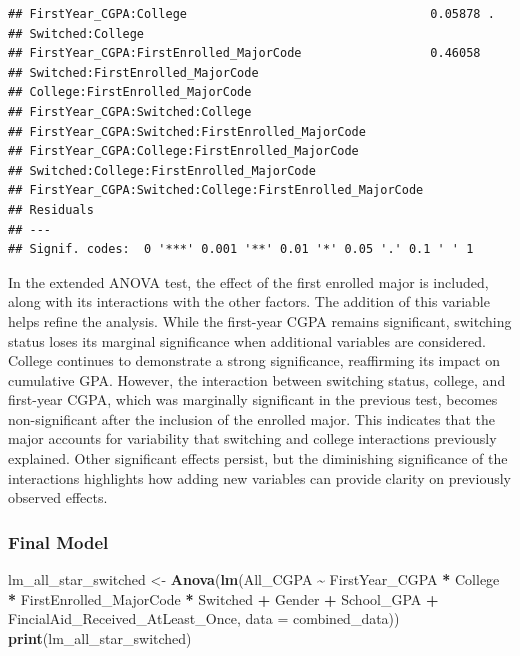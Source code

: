 \documentclass[
  12pt,
]{article}
\newenvironment{Shaded}{\begin{snugshade}}{\end{snugshade}}
\newcommand{\AttributeTok}[1]{\textcolor[rgb]{0.13,0.29,0.53}{#1}}
\newcommand{\FunctionTok}[1]{\textcolor[rgb]{0.13,0.29,0.53}{\textbf{#1}}}
\newcommand{\NormalTok}[1]{#1}
\newcommand{\OtherTok}[1]{\textcolor[rgb]{0.56,0.35,0.01}{#1}}
\newcommand{\SpecialCharTok}[1]{\textcolor[rgb]{0.81,0.36,0.00}{\textbf{#1}}}
\begin{document}
\begin{verbatim}
## FirstYear_CGPA:College                                  0.05878 .  
## Switched:College                                                   
## FirstYear_CGPA:FirstEnrolled_MajorCode                  0.46058    
## Switched:FirstEnrolled_MajorCode                                   
## College:FirstEnrolled_MajorCode                                    
## FirstYear_CGPA:Switched:College                                    
## FirstYear_CGPA:Switched:FirstEnrolled_MajorCode                    
## FirstYear_CGPA:College:FirstEnrolled_MajorCode                     
## Switched:College:FirstEnrolled_MajorCode                           
## FirstYear_CGPA:Switched:College:FirstEnrolled_MajorCode            
## Residuals                                                          
## ---
## Signif. codes:  0 '***' 0.001 '**' 0.01 '*' 0.05 '.' 0.1 ' ' 1
\end{verbatim}

In the extended ANOVA test, the effect of the first enrolled major is
included, along with its interactions with the other factors. The
addition of this variable helps refine the analysis. While the
first-year CGPA remains significant, switching status loses its marginal
significance when additional variables are considered. College continues
to demonstrate a strong significance, reaffirming its impact on
cumulative GPA. However, the interaction between switching status,
college, and first-year CGPA, which was marginally significant in the
previous test, becomes non-significant after the inclusion of the
enrolled major. This indicates that the major accounts for variability
that switching and college interactions previously explained. Other
significant effects persist, but the diminishing significance of the
interactions highlights how adding new variables can provide clarity on
previously observed effects.

\subsubsection{Final Model}\label{final-model}

\begin{Shaded}
\begin{Highlighting}[]
\NormalTok{lm\_all\_star\_switched }\OtherTok{\textless{}{-}} \FunctionTok{Anova}\NormalTok{(}\FunctionTok{lm}\NormalTok{(All\_CGPA }\SpecialCharTok{\textasciitilde{}}\NormalTok{ FirstYear\_CGPA }\SpecialCharTok{*}\NormalTok{ College }\SpecialCharTok{*}\NormalTok{ FirstEnrolled\_MajorCode }\SpecialCharTok{*}
\NormalTok{    Switched }\SpecialCharTok{+}\NormalTok{ Gender }\SpecialCharTok{+}\NormalTok{ School\_GPA }\SpecialCharTok{+}\NormalTok{ FincialAid\_Received\_AtLeast\_Once, }\AttributeTok{data =}\NormalTok{ combined\_data))}
\FunctionTok{print}\NormalTok{(lm\_all\_star\_switched)}
\end{Highlighting}
\end{Shaded}
\end{document}

